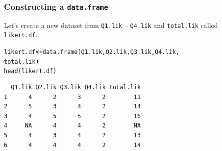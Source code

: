 \documentclass{beamer}\usepackage[]{graphicx}\usepackage[]{color}
\makeatletter
\newcommand{\hlstd}[1]{\textcolor[rgb]{0,0,0}{#1}}%
\newcommand{\hlkwb}[1]{\textcolor[rgb]{0,0,0.4}{\textbf{#1}}}%
\newcommand{\hlkwd}[1]{\textcolor[rgb]{0,0.267,0.4}{#1}}%
\newenvironment{kframe}{%
 \def\at@end@of@kframe{}%
 \ifinner\ifhmode%
  \def\at@end@of@kframe{\end{minipage}}%
  \begin{minipage}{\columnwidth}%
 \fi\fi%
 \def\FrameCommand##1{\hskip\@totalleftmargin \hskip-\fboxsep
 \colorbox{shadecolor}{##1}\hskip-\fboxsep
     \hskip-\linewidth \hskip-\@totalleftmargin \hskip\columnwidth}%
 \MakeFramed {\advance\hsize-\width
   \@totalleftmargin\z@ \linewidth\hsize
   \@setminipage}}%
 {\par\unskip\endMakeFramed%
 \at@end@of@kframe}
\newenvironment{knitrout}{}{} %
\makeatother
\begin{document}
\begin{frame}[fragile]
\frametitle{Constructing a \texttt{data.frame}}
Let's create a new dataset from \texttt{Q1.lik} -- \texttt{Q4.lik} and \texttt{total.lik} called \texttt{likert.df}.
\begin{knitrout}
\color{fgcolor}\begin{kframe}
\begin{alltt}
\hlstd{likert.df} \hlkwb{<-} \hlkwd{data.frame}\hlstd{(Q1.lik, Q2.lik, Q3.lik, Q4.lik,}
                        \hlstd{total.lik)}
\hlkwd{head}\hlstd{(likert.df)}
\end{alltt}
\begin{verbatim}
  Q1.lik Q2.lik Q3.lik Q4.lik total.lik
1      4      2      3      2        11
2      5      3      4      2        14
3      4      5      5      2        16
4     NA      4      4      2        NA
5      4      3      4      2        13
6      4      4      4      2        14
\end{verbatim}
\end{kframe}
\end{knitrout}
\end{frame}
\end{document}
